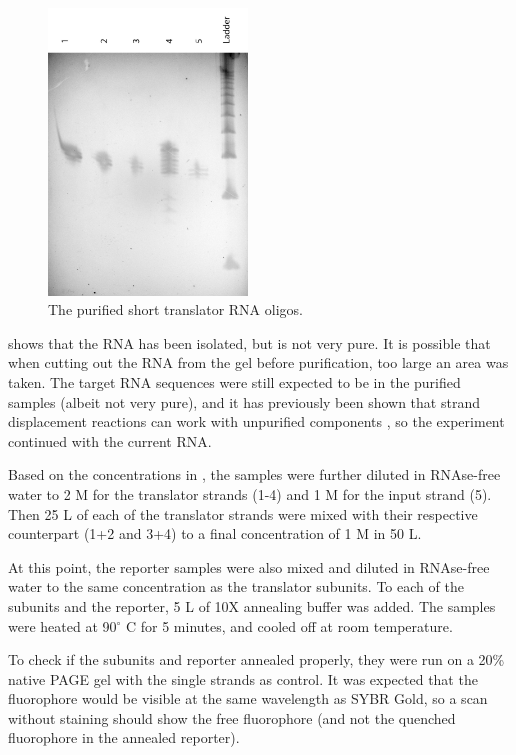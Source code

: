 \begin{figure}[H]
\centering
\includegraphics[width=150pt]{images/translator_transcription_purified.png}
\caption{The purified short translator RNA oligos.}
\label{translator_transcription_purified}
\end{figure}

 shows that the RNA has been isolated, but is not very pure. It is possible that when cutting out the RNA from the gel before purification, too large an area was taken. The target RNA sequences were still expected to be in the purified samples (albeit not very pure), and it has previously been shown that strand displacement reactions can work with unpurified components \cite{Thubagere2017}, so the experiment continued with the current RNA.

Based on the concentrations in , the samples were further diluted in RNAse-free water to 2 \si{\micro}M for the translator strands (1-4) and 1 \si{\micro}M for the input strand (5). Then 25 \si{\micro}L of each of the translator strands were mixed with their respective counterpart (1+2 and 3+4) to a final concentration of 1 \si{\micro}M in 50 \si{\micro}L.

At this point, the reporter samples were also mixed and diluted in RNAse-free water to the same concentration as the translator subunits. To each of the subunits and the reporter, 5 \si{\micro}L of 10X annealing buffer was added. The samples were heated at 90$^\circ$ C for 5 minutes, and cooled off at room temperature.

To check if the subunits and reporter annealed properly, they were run on a 20\% native PAGE gel with the single strands as control. It was expected that the fluorophore would be visible at the same wavelength as SYBR Gold, so a scan without staining should show the free fluorophore (and not the quenched fluorophore in the annealed reporter).

